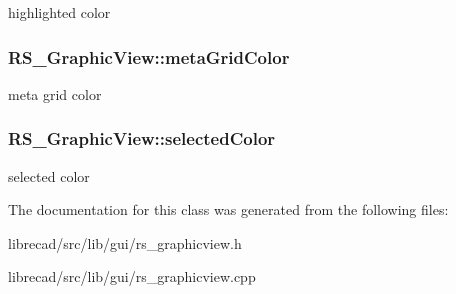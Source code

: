 highlighted color \hypertarget{classRS__GraphicView_a50193620c821e86e68a7b914bff7afd1}{
\subsubsection[{meta\-Grid\-Color}]{ R\-S\-\_\-\-Graphic\-View\-::meta\-Grid\-Color\hspace{0.3cm}{\ttfamily [protected]}}}\label{classRS__GraphicView_a50193620c821e86e68a7b914bff7afd1}
meta grid color \hypertarget{classRS__GraphicView_a7c3c832cd4ed3ea5c7ab5af2a07eeee9}{
\subsubsection[{selected\-Color}]{ R\-S\-\_\-\-Graphic\-View\-::selected\-Color\hspace{0.3cm}{\ttfamily [protected]}}}\label{classRS__GraphicView_a7c3c832cd4ed3ea5c7ab5af2a07eeee9}
selected color 

The documentation for this class was generated from the following files\-:\begin{DoxyCompactItemize}
\item 
librecad/src/lib/gui/rs\-\_\-graphicview.\-h\item 
librecad/src/lib/gui/rs\-\_\-graphicview.\-cpp\end{DoxyCompactItemize}
